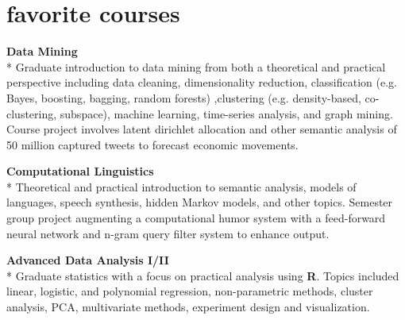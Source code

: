 \documentclass[]{friggeri-cv} %
\begin{document}



\section{favorite courses}
\begin{description}
  \item \textbf{Data Mining } \\*
    Graduate introduction to data mining from both a theoretical and practical
    perspective including data cleaning, dimensionality reduction,
    classification (e.g. Bayes, boosting, bagging, random forests) ,clustering
    (e.g. density-based, co-clustering, subspace), machine learning,
    time-series analysis, and graph mining.  Course project involves latent
    dirichlet allocation and other semantic analysis of 50 million captured
    tweets to forecast economic movements. \hfill
   \item \textbf{Computational Linguistics} \\*
     Theoretical and practical introduction to semantic analysis, models of
     languages, speech synthesis, hidden Markov models, and other topics.
     Semester group project augmenting a computational humor system with a
     feed-forward neural network and n-gram query filter system to enhance
     output.
 \item \textbf{Advanced Data Analysis I/II} \\*
     Graduate statistics with a focus on practical analysis using \textbf{R}.
     Topics included linear, logistic, and polynomial regression,
     non-parametric methods, cluster analysis, PCA, multivariate methods,
     experiment design and visualization.
\end{description}
\end{document}
